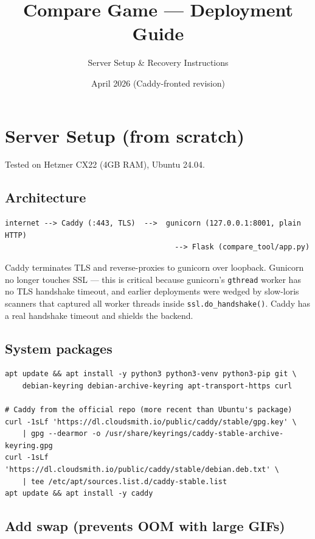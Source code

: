 \documentclass[11pt]{article}
\title{Compare Game --- Deployment Guide}
\author{Server Setup \& Recovery Instructions}
\date{April 2026 (Caddy-fronted revision)}
\begin{document}
\maketitle

\section{Server Setup (from scratch)}

Tested on Hetzner CX22 (4GB RAM), Ubuntu 24.04.

\subsection{Architecture}

\begin{verbatim}
internet --> Caddy (:443, TLS)  -->  gunicorn (127.0.0.1:8001, plain HTTP)
                                       --> Flask (compare_tool/app.py)
\end{verbatim}

Caddy terminates TLS and reverse-proxies to gunicorn over loopback. Gunicorn no longer touches SSL — this is critical because gunicorn's \texttt{gthread} worker has no TLS handshake timeout, and earlier deployments were wedged by slow-loris scanners that captured all worker threads inside \texttt{ssl.do\_handshake()}. Caddy has a real handshake timeout and shields the backend.

\subsection{System packages}

\begin{lstlisting}
apt update && apt install -y python3 python3-venv python3-pip git \
    debian-keyring debian-archive-keyring apt-transport-https curl

# Caddy from the official repo (more recent than Ubuntu's package)
curl -1sLf 'https://dl.cloudsmith.io/public/caddy/stable/gpg.key' \
    | gpg --dearmor -o /usr/share/keyrings/caddy-stable-archive-keyring.gpg
curl -1sLf 'https://dl.cloudsmith.io/public/caddy/stable/debian.deb.txt' \
    | tee /etc/apt/sources.list.d/caddy-stable.list
apt update && apt install -y caddy
\end{lstlisting}

\subsection{Add swap (prevents OOM with large GIFs)}
\end{document}
